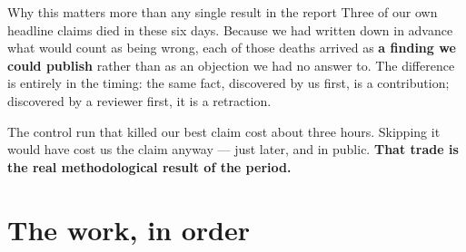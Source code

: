 \documentclass[11pt]{article}
\begin{document}
\begin{keybox}{Why this matters more than any single result in the report}
Three of our own headline claims died in these six days. Because we had written down in advance what
would count as being wrong, each of those deaths arrived as \textbf{a finding we could publish} rather
than as an objection we had no answer to. The difference is entirely in the timing: the same fact,
discovered by us first, is a contribution; discovered by a reviewer first, it is a retraction.

The control run that killed our best claim cost about three hours. Skipping it would have cost us the
claim anyway --- just later, and in public. \textbf{That trade is the real methodological result of the
period.}
\end{keybox}

\section{The work, in order}
\label{sec:work}
\end{document}
